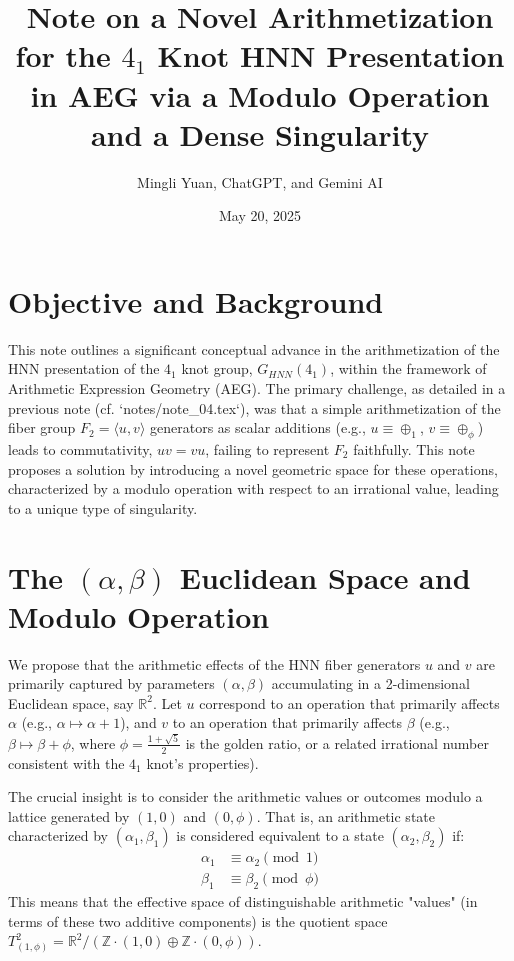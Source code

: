 \documentclass[12pt, a4paper]{article}
\title{Note on a Novel Arithmetization for the $4_1$ Knot HNN Presentation in AEG via a Modulo Operation and a Dense Singularity}
\author{Mingli Yuan, ChatGPT, and Gemini AI} %
\date{May 20, 2025} %
\begin{document}
\maketitle

\section{Objective and Background}
This note outlines a significant conceptual advance in the arithmetization of the HNN presentation of the $4_1$ knot group, $G_{HNN}(4_1)$, within the framework of Arithmetic Expression Geometry (AEG).
The primary challenge, as detailed in a previous note (cf. `notes/note\_04.tex`), was that a simple arithmetization of the fiber group $F_2 = \langle u, v \rangle$ generators as scalar additions (e.g., $u \equiv \oplus_1$, $v \equiv \oplus_\phi$) leads to commutativity, $uv=vu$, failing to represent $F_2$ faithfully. This note proposes a solution by introducing a novel geometric space for these operations, characterized by a modulo operation with respect to an irrational value, leading to a unique type of singularity.

\section{The $(\alpha, \beta)$ Euclidean Space and Modulo Operation}
We propose that the arithmetic effects of the HNN fiber generators $u$ and $v$ are primarily captured by parameters $(\alpha, \beta)$ accumulating in a 2-dimensional Euclidean space, say $\mathbb{R}^2$.
Let $u$ correspond to an operation that primarily affects $\alpha$ (e.g., $\alpha \mapsto \alpha + 1$), and $v$ to an operation that primarily affects $\beta$ (e.g., $\beta \mapsto \beta + \phi$, where $\phi = \frac{1+\sqrt{5}}{2}$ is the golden ratio, or a related irrational number consistent with the $4_1$ knot's properties).

The crucial insight is to consider the arithmetic values or outcomes modulo a lattice generated by $(1,0)$ and $(0,\phi)$. That is, an arithmetic state characterized by $(\alpha_1, \beta_1)$ is considered equivalent to a state $(\alpha_2, \beta_2)$ if:
\begin{align*}
    \alpha_1 &\equiv \alpha_2 \pmod 1 \\
    \beta_1 &\equiv \beta_2 \pmod \phi
\end{align*}
This means that the effective space of distinguishable arithmetic "values" (in terms of these two additive components) is the quotient space $T^2_{(1,\phi)} = \mathbb{R}^2 / (\mathbb{Z}\cdot(1,0) \oplus \mathbb{Z}\cdot(0,\phi))$.
\end{document}
